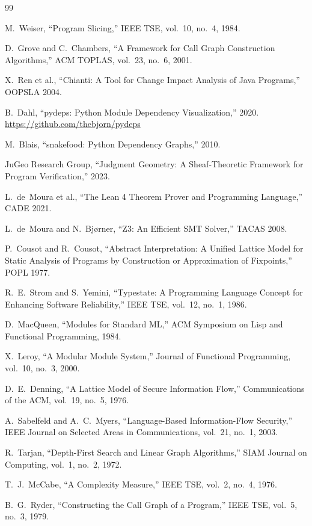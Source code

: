 \documentclass[11pt]{article}
\begin{document}
\begin{thebibliography}{99}

M.~Weiser, ``Program Slicing,'' IEEE TSE, vol.~10, no.~4, 1984.

D.~Grove and C.~Chambers, ``A Framework for Call Graph Construction
Algorithms,'' ACM TOPLAS, vol.~23, no.~6, 2001.

X.~Ren et al., ``Chianti: A Tool for Change Impact Analysis of Java
Programs,'' OOPSLA 2004.

B.~Dahl, ``pydeps: Python Module Dependency Visualization,'' 2020.
\url{https://github.com/thebjorn/pydeps}

M.~Blais, ``snakefood: Python Dependency Graphs,'' 2010.

JuGeo Research Group, ``Judgment Geometry: A Sheaf-Theoretic Framework for
Program Verification,'' 2023.

L.~de~Moura et al., ``The Lean 4 Theorem Prover and Programming Language,''
CADE 2021.

L.~de~Moura and N.~Bjørner, ``Z3: An Efficient SMT Solver,'' TACAS 2008.

P.~Cousot and R.~Cousot, ``Abstract Interpretation: A Unified Lattice Model
for Static Analysis of Programs by Construction or Approximation of
Fixpoints,'' POPL 1977.

R.~E.~Strom and S.~Yemini, ``Typestate: A Programming Language Concept for
Enhancing Software Reliability,'' IEEE TSE, vol.~12, no.~1, 1986.

D.~MacQueen, ``Modules for Standard ML,'' ACM Symposium on Lisp and
Functional Programming, 1984.

X.~Leroy, ``A Modular Module System,'' Journal of Functional Programming,
vol.~10, no.~3, 2000.

D.~E.~Denning, ``A Lattice Model of Secure Information Flow,''
Communications of the ACM, vol.~19, no.~5, 1976.

A.~Sabelfeld and A.~C.~Myers, ``Language-Based Information-Flow Security,''
IEEE Journal on Selected Areas in Communications, vol.~21, no.~1, 2003.

R.~Tarjan, ``Depth-First Search and Linear Graph Algorithms,'' SIAM
Journal on Computing, vol.~1, no.~2, 1972.

T.~J.~McCabe, ``A Complexity Measure,'' IEEE TSE, vol.~2, no.~4, 1976.

B.~G.~Ryder, ``Constructing the Call Graph of a Program,'' IEEE TSE,
vol.~5, no.~3, 1979.

\end{thebibliography}
\end{document}
